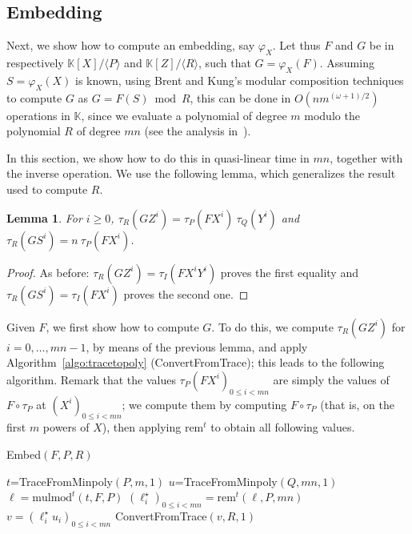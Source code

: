 \documentclass[12pt]{article}
\def\K {\ensuremath{\mathbb{K}}}
\def\rem {\ensuremath{\mathrm{rem}}}
\def\mulmod {\ensuremath{\mathrm{mulmod}}}
\newtheorem{Lemma}{Lemma}
\begin{document}
\subsection{Embedding} 

Next, we show how to compute an embedding, say $\varphi_X$. Let thus
$F$ and $G$ be in respectively $\K[X]/\langle P \rangle$ and
$\K[Z]/\langle R \rangle$, such that $G=\varphi_X(F)$. Assuming
$S=\varphi_X(X)$ is known, using Brent and Kung's modular composition
techniques~\cite{brent+kung} to compute $G$ as $G=F(S) \bmod R$, this
can be done in $O(n m^{(\omega+1)/2})$ operations in $\K$, since we
evaluate a polynomial of degree $m$ modulo the polynomial $R$ of
degree $mn$ (see the analysis in~\cite{shoup94}).

In this section, we show how to do this in quasi-linear time in $mn$,
together with the inverse operation. We use the following lemma, which
generalizes the result used to compute $R$.

\begin{Lemma}\label{lemma:traces:PQR}
  For $i \ge 0$, $\tau_R(G Z^i) = \tau_P(F X^i) \ \tau_Q(Y^i)$ and
  $\tau_R(G S^i) = n\ \tau_P(F X^i)$.
\end{Lemma}
\begin{proof}
As before: $\tau_R(G Z^i) = \tau_I(F X^i Y^i)$ proves the first
equality and $\tau_R(G S^i) = \tau_I(F X^i)$ proves the second one.
\end{proof}

Given $F$, we first show how to compute $G$. To do this, we compute
$\tau_R(G Z^i)$ for $i=0,\dots,mn-1$, by means of the previous lemma,
and apply Algorithm~\ref{algo:tracetopoly} (ConvertFromTrace); this
leads to the following algorithm. Remark that the values $\tau_P(F
X^i)_{0 \le i < mn}$ are simply the values of $F \circ \tau_P$ at
$(X^i)_{0 \le i < mn}$; we compute them by computing $F \circ \tau_P$
(that is, on the first $m$ powers of $X$), then applying $\rem^t$ to
obtain all following values.

\begin{algorithm}[H]
  \caption{Embed$(F,P,R)$}
  \begin{algorithmic}[1]
    \STATE $t$=TraceFromMinpoly$(P,m,1)$
    \STATE $u$=TraceFromMinpoly$(Q,mn,1)$
    \STATE\label{algo:embed:2} $\ell = \mulmod^t(t,F,P)$
    \STATE $(\ell^\star_i)_{0 \le i < mn} = \rem^t(\ell, P, mn)$
    \STATE $v=(\ell^\star_i u_i)_{0 \le i < mn}$
    \RETURN ConvertFromTrace$(v, R, 1)$
  \end{algorithmic}
  \label{algo:embed}
\end{algorithm}
\end{document}
